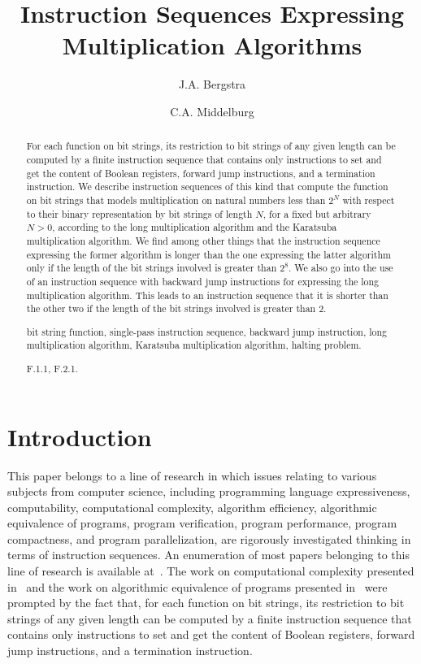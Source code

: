 \documentclass{llncs}
\title{Instruction Sequences Expressing \\ Multiplication Algorithms}
\author{J.A. Bergstra \and C.A. Middelburg}
\institute{Informatics Institute, Faculty of Science, University of
           Amsterdam, \\
           Science Park~904, 1098~XH Amsterdam, the Netherlands \\
           \email{J.A.Bergstra@uva.nl,C.A.Middelburg@uva.nl}}
\begin{document}
\maketitle

\begin{abstract}
For each function on bit strings, its restriction to bit strings of any 
given length can be computed by a finite instruction sequence that 
contains only instructions to set and get the content of Boolean 
registers, forward jump instructions, and a termination instruction.
We describe instruction sequences of this kind that compute the function 
on bit strings that models multiplication on natural numbers less than 
$2^N$ with respect to their binary representation by bit strings of 
length $N$, for a fixed but arbitrary $N > 0$, according to the long 
multiplication algorithm and the Karatsuba multiplication algorithm.
We find among other things that the instruction sequence expressing the 
former algorithm is longer than the one expressing the latter algorithm 
only if the length of the bit strings involved is greater than $2^8$.
We also go into the use of an instruction sequence with backward jump 
instructions for expressing the long multiplication algorithm.
This leads to an instruction sequence that it is shorter than the other 
two if the length of the bit strings involved is greater than $2$.
\begin{keywords} 
bit string function, 
single-pass instruction sequence, backward jump instruction, 
long multiplication algorithm, Karatsuba multiplication algorithm,
halting problem.
\end{keywords}\begin{classcode}
F.1.1, F.2.1.
\end{classcode}
\end{abstract}

\section{Introduction}
\label{sect-intro}

This paper belongs to a line of research in which issues relating to 
various subjects from computer science, including programming language
expressiveness, computability, computational complexity, algorithm 
efficiency, algorithmic equivalence of programs, program verification, 
program performance, program compactness, and program parallelization, 
are rigorously investigated thinking in terms of instruction sequences.
An enumeration of most papers belonging to this line of research is 
available at~\cite{SiteIS}.
The work on computational complexity presented in~\cite{BM13a,BM14e} and 
the work on algorithmic equivalence of programs presented 
in~\cite{BM14a} were prompted by the fact that, for each function on bit 
strings, its restriction to bit strings of any given length can be 
computed by a finite instruction sequence that contains only 
instructions to set and get the content of Boolean registers, forward 
jump instructions, and a termination instruction.
\end{document}
